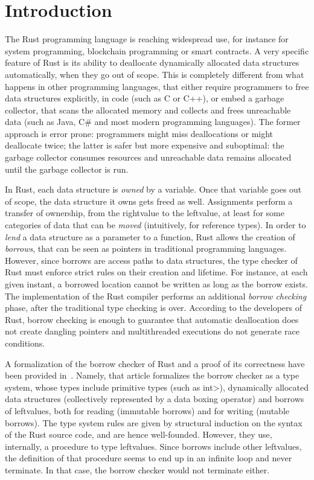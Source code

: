 \section{Introduction}\label{sec:introduction}

The Rust programming language is reaching widespread use,
for instance for system programming,
blockchain programming or smart contracts.
A very specific feature of Rust is its ability to deallocate dynamically allocated
data structures automatically, when they go out of scope. This is completely different
from what happens in other programming languages, that either require programmers to free data structures
explicitly, in code (such as C or C++), or embed a garbage collector, that scans the allocated memory
and collects and frees unreachable data (such as Java, C\# and most modern programming languages).
The former approach is error prone: programmers might miss deallocations or might deallocate twice;
the latter is safer but more expensive and suboptimal:
the garbage collector consumes resources and unreachable data remains
allocated until the garbage collector is run.

In Rust, each data structure is \emph{owned} by a variable. Once that variable goes
out of scope, the data structure it owns gets freed as well. Assignments perform
a transfer of ownership, from the rightvalue to the leftvalue, at least for some
categories of data that can be \emph{moved} (intuitively, for reference types).
In order to \emph{lend} a data structure as a parameter to a function, Rust allows the
creation of \emph{borrows}, that can be seen as pointers in traditional programming languages.
However, since borrows are access paths to data structures, the type checker of Rust
must enforce strict rules on their creation and lifetime. For instance, at each given
instant, a borrowed location cannot be written as long as the borrow exists.
The implementation of the Rust compiler performs an additional \emph{borrow checking} phase,
after the traditional type checking is over.
According to the developers of Rust, borrow checking is enough to guarantee that
automatic deallocation does not create dangling pointers and multithreaded
executions do not generate race conditions.

A formalization of the borrow checker of Rust and a proof of its correctness have been provided in~\cite{Pearce21}.
Namely, that article formalizes the borrow checker as a type system, whose
types include primitive types (such as \<int>), dynamically allocated data structures
(collectively represented by a data boxing operator) and borrows of leftvalues,
both for reading (immutable borrows)
and for writing (mutable borrows). The type system rules are given by structural induction
on the syntax of the Rust source code, and are hence well-founded. However, they use, internally,
a procedure to type leftvalues. Since borrows include other leftvalues,
the definition of that procedure seems to end up in an infinite loop and never terminate.
In that case, the borrow checker would not terminate either.

